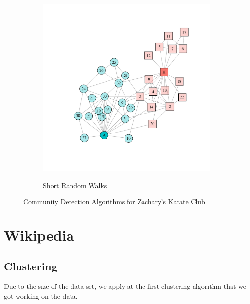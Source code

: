 \begin{figure}
\begin{subfigure}[b]{0.32\textwidth}
\label{fig:spinglass}
\end{subfigure}
\hfill
\begin{subfigure}[b]{0.32\textwidth}
\caption{Short Random Walks}
\includegraphics[width=\textwidth,trim={0.75in 0.75in 0.75in 0.75in}, clip=True]{walktrap.pdf}
\label{fig:walktrap}
\end{subfigure}
\caption{Community Detection Algorithms for Zachary's Karate Club}
\end{figure}

\section{Wikipedia}
\subsection{Clustering}
Due to the size of the data-set, we apply at the first clustering algorithm that we got working on the data.

